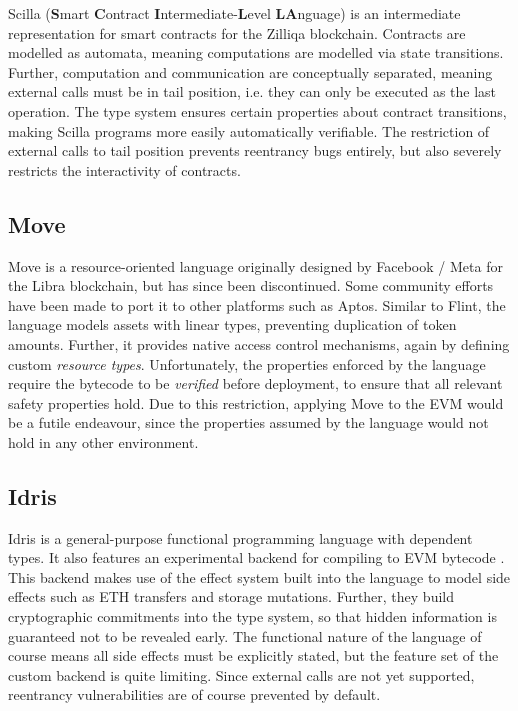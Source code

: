 Scilla \cite{scilla} (\textbf{S}mart \textbf{C}ontract \textbf{I}ntermediate-\textbf{L}evel \textbf{LA}nguage) is an intermediate representation for smart contracts for the Zilliqa blockchain. Contracts are modelled as automata, meaning computations are modelled via state transitions. Further, computation and communication are conceptually separated, meaning external calls must be in tail position, i.e. they can only be executed as the last operation. The type system ensures certain properties about contract transitions, making Scilla programs more easily automatically verifiable. The restriction of external calls to tail position prevents reentrancy bugs entirely, but also severely restricts the interactivity of contracts.

\subsection{Move}

Move \cite{move} is a resource-oriented language originally designed by Facebook / Meta for the Libra blockchain, but has since been discontinued. Some community efforts have been made to port it to other platforms such as Aptos. Similar to Flint, the language models assets with linear types, preventing duplication of token amounts. Further, it provides native access control mechanisms, again by defining custom \textit{resource types}. Unfortunately, the properties enforced by the language require the bytecode to be \textit{verified} before deployment, to ensure that all relevant safety properties hold. Due to this restriction, applying Move to the EVM would be a futile endeavour, since the properties assumed by the language would not hold in any other environment.

\subsection{Idris}
Idris \cite{idris1} \cite{idris2} is a general-purpose functional programming language with dependent types. It also features an experimental backend for compiling to EVM bytecode \cite{idris-evm}. This backend makes use of the effect system built into the language to model side effects such as ETH transfers and storage mutations. Further, they build cryptographic commitments into the type system, so that hidden information is guaranteed not to be revealed early. The functional nature of the language of course means all side effects must be explicitly stated, but the feature set of the custom backend is quite limiting. Since external calls are not yet supported, reentrancy vulnerabilities are of course prevented by default.

